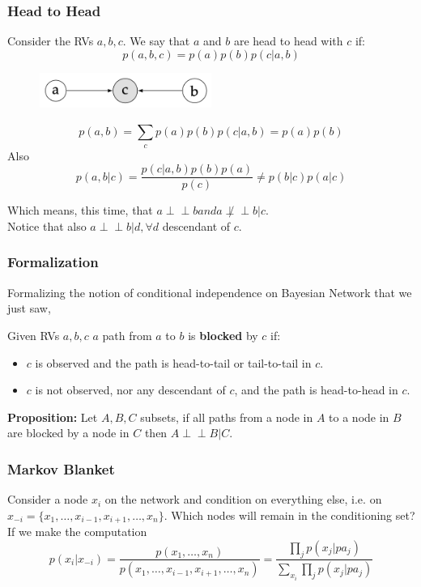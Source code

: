 \subsubsection{Head to Head}

Consider the RVs $a, b, c$. We say that $a$ and $b$ are head to head with $c$ if:
\[
    p(a, b, c) = p(a)p(b)p(c|a,b)
\]
\begin{figure}[H]
    \centering
    \includegraphics[width=0.5\textwidth]{assets/fig16.png}
\end{figure}

\[
    p(a,b) = \sum_{c}^{}p(a)p(b)p(c|a,b) = p(a)p(b)
\]
Also 
\[
    p(a,b|c) = \frac{p(c|a,b)p(b)p(a)}{p(c)} \neq p(b|c)p(a|c)
\]

Which means, this time, that $a \perp\!\!\!\perp b and a \not \perp\!\!\!\perp b|c$.\\
Notice that also $a \perp\!\!\!\perp b|d, \forall d$ descendant of $c$. 

\subsubsection*{Formalization}
Formalizing the notion of conditional independence on Bayesian Network that we just saw,
\begin{definitionblock}
    Given RVs $a, b, c$ $a$ path from $a$ to $b$ is \textbf{blocked} by $c$ if:
    \begin{itemize}
        \item $c$ is observed and the path is head-to-tail or tail-to-tail in $c$.
        \item $c$ is not observed, nor any descendant of $c$, and the path is head-to-head in $c$.
    \end{itemize}
\end{definitionblock}

\textbf{Proposition:} Let $A,B,C$ subsets, if all paths from a node in $A$ to a node in $B$ are blocked by a node in $C$ then $A \perp\!\!\!\perp B|C$.

\subsubsection{Markov Blanket}

Consider a node $x_i$ on the network and condition on everything else, i.e. on $x_{-i} = \{x_1, \dots, x_{i-1}, x_{i+1}, \dots, x_n\}$. Which nodes will remain in the conditioning set? If we make the computation 
\[
    p(x_i|x_{-i}) = \frac{p(x_1, \dots, x_n)}{p(x_1, \dots, x_{i-1}, x_{i+1}, \dots, x_n)} = \frac{\prod_{j}^{}p(x_j|pa_j)}{\sum_{x_i}^{}\prod_{j}^{}p(x_j|pa_j)}
\]

